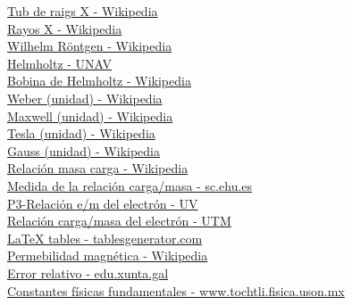 \documentclass[11pt]{article}
\begin{document}
    \href{https://ca.wikipedia.org/wiki/Tub_de_raigs_X}{Tub de raigs X - Wikipedia}\\

    \href{https://es.wikipedia.org/wiki/Rayos_X}{Rayos X - Wikipedia}\\

    \href{https://es.wikipedia.org/wiki/Wilhelm_R%C3%B6ntgen}{Wilhelm Röntgen - Wikipedia}\\
    
    \href{https://www.unav.es/gep/Helmholtz.html}{Helmholtz - UNAV}\\
    
    \href{https://es.wikipedia.org/wiki/Bobina_de_Helmholtz}{Bobina de Helmholtz - Wikipedia}\\
    
    \href{https://es.wikipedia.org/wiki/Weber_(unidad)}{Weber (unidad) - Wikipedia}\\
    
    \href{https://es.wikipedia.org/wiki/Maxwell_(unidad)}{Maxwell (unidad) - Wikipedia}\\
    
    \href{https://es.wikipedia.org/wiki/Tesla_(unidad)}{Tesla (unidad) - Wikipedia}\\
    
    \href{https://es.wikipedia.org/wiki/Gauss_(unidad)}{Gauss (unidad) - Wikipedia}\\
    
    \href{https://es.wikipedia.org/wiki/Relaci%C3%B3n_masa_carga}{Relación masa carga - Wikipedia}\\
    
    \href{http://www.sc.ehu.es/sbweb/fisica/elecmagnet/thomson/Thomson.html}{Medida de la relación carga/masa - sc.ehu.es}\\
    
    \href{https://www.uv.es/inecfis/QPhVL/p3/p3_intro.html}{P3-Relación e/m del electrón - UV}\\
    
    \href{https://www.utm.mx/~labfis/practicas/fisica_moderna/relacion_carga_masa.pdf}{Relación carga/masa del electrón - UTM}\\
    
    \href{https://www.tablesgenerator.com/}{LaTeX tables - tablesgenerator.com}\\
    
    \href{https://es.wikipedia.org/wiki/Permeabilidad_magn%C3%A9tica}{Permebilidad magnética - Wikipedia}\\
    
    \href{https://www.edu.xunta.gal/centros/cafi/aulavirtual/pluginfile.php/40439/mod_imscp/content/2/error_relativo.html#:~:text=El%20error%20relativo%20se%20calcula,absoluto%20entre%20el%20valor%20real.}{Error relativo - edu.xunta.gal}\\
    
    \href{https://www.tochtli.fisica.uson.mx/electro/Constantes_fisicas_fundamentales.htm}{Constantes físicas fundamentales - www.tochtli.fisica.uson.mx}\\
\end{document}
